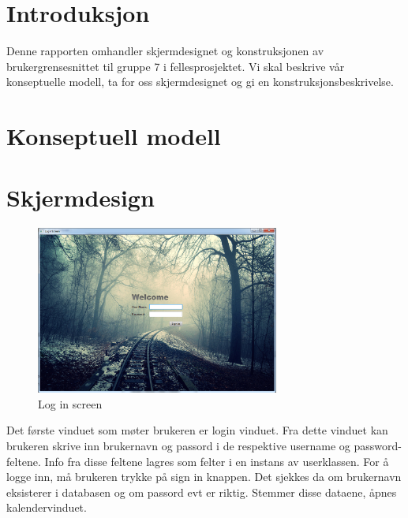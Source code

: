\documentclass{article}
\begin{document}

\section{Introduksjon}
Denne rapporten omhandler skjermdesignet og konstruksjonen av brukergrensesnittet til gruppe 7 i fellesprosjektet. Vi skal beskrive vår konseptuelle modell, ta for oss skjermdesignet og gi en konstruksjonsbeskrivelse. 

\section{Konseptuell modell}



\section{Skjermdesign}

\begin{figure}[h!] 
    \begin{center} 
        \includegraphics[width=8cm]{LoginScreen.png}
        \caption{Log in screen}
    \label{login}
    \end{center}
\end{figure}

Det første vinduet som møter brukeren er login vinduet. Fra dette vinduet kan brukeren skrive inn brukernavn og passord i de respektive username og password-feltene. Info fra disse feltene lagres som felter i en instans av userklassen. For å logge inn, må brukeren trykke på sign in knappen. Det sjekkes da om brukernavn eksisterer i databasen og om passord evt er riktig. Stemmer disse dataene, åpnes kalendervinduet.


\newpage
\end{document}
